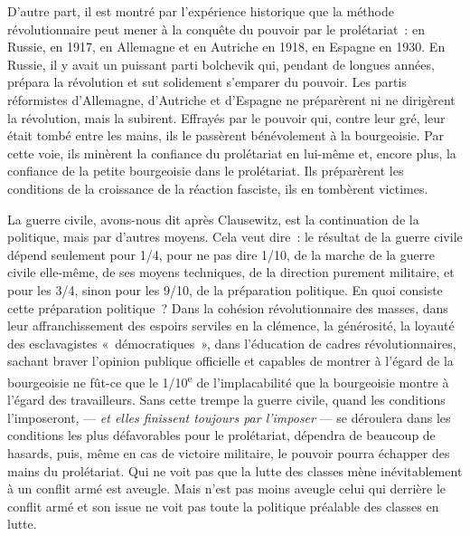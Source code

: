 \documentclass[french,twoside]{book} %
\begin{document}
D’autre part, il est montré par l’expérience historique que la méthode révolutionnaire peut mener à la conquête du pouvoir par le prolétariat : en Russie, en 1917, en Allemagne et en Autriche en 1918, en Espagne en 1930. En Russie, il y avait un puissant parti bolchevik qui, pendant de longues années, prépara la révolution et sut solidement s’emparer du pouvoir. Les partis réformistes d’Allemagne, d’Autriche et d’Espagne ne préparèrent ni ne dirigèrent la révolution, mais la subirent. Effrayés par le pouvoir qui, contre leur gré, leur était tombé entre les mains, ils le passèrent bénévolement à la bourgeoisie. Par cette voie, ils minèrent la confiance du prolétariat en lui-même et, encore plus, la confiance de la petite bourgeoisie dans le prolétariat. Ils préparèrent les conditions de la croissance de la réaction fasciste, ils en tombèrent victimes.\par
La guerre civile, avons-nous dit après Clausewitz, est la continuation de la politique, mais par d’autres moyens. Cela veut dire : le résultat de la guerre civile dépend seulement pour 1/4, pour ne pas dire 1/10, de la marche de la guerre civile elle-même, de ses moyens techniques, de la direction purement militaire, et pour les 3/4, sinon pour les 9/10, de la préparation politique. En quoi consiste cette préparation politique ? Dans la cohésion révolutionnaire des masses, dans leur affranchissement des espoirs serviles en la clémence, la générosité, la loyauté des esclavagistes « démocratiques », dans l’éducation de cadres révolutionnaires, sachant braver l’opinion publique officielle et capables de montrer à l’égard de la bourgeoisie ne fût-ce que le 1/10\textsuperscript{e} de l’implacabilité que la bourgeoisie montre à l’égard des travailleurs.  Sans cette trempe la guerre civile, quand les conditions l’imposeront, — \emph{et elles finissent toujours par l’imposer} — se déroulera dans les conditions les plus défavorables pour le prolétariat, dépendra de beaucoup de hasards, puis, même en cas de victoire militaire, le pouvoir pourra échapper des mains du prolétariat. Qui ne voit pas que la lutte des classes mène inévitablement à un conflit armé est aveugle. Mais n’est pas moins aveugle celui qui derrière le conflit armé et son issue ne voit pas toute la politique préalable des classes en lutte.\par
\end{document}
